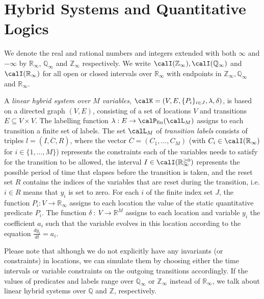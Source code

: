 \documentclass[fleqn,envcountsame]{LMCS}
\newcommand{\ie}{i.e.\xspace}
\newcommand{\Rinf}{\ensuremath{\mathbb{R}_{\infty}}}
\newcommand{\Qinf}{\ensuremath{\mathbb{Q}_{\infty}}}
\newcommand{\Zinf}{\ensuremath{\mathbb{Z}_{\infty}}}
\newcommand{\setR}{\ensuremath{\mathbb{R}}}
\newcommand{\setQ}{\ensuremath{\mathbb{Q}}}
\newcommand{\setZ}{\ensuremath{\mathbb{Z}}}
\newcommand{\Pot}{\ensuremath{\calP}}
\newcommand{\ol}[1]{\ensuremath{\overline{#1}}}
\newcommand{\intervals}{\ensuremath{\calI(\Rinf)}}
\newcommand{\intervalsplus}{\ensuremath{\calI(\Rinf^{\geq 0})}}
\newcommand{\coeff}{\ensuremath{\delta}} \newcommand{\indexi}{\ensuremath{\iota}}
\begin{document}
\section{Hybrid Systems and Quantitative Logics} \label{sec_hybrid}
We denote the real and rational numbers and integers extended with both
$\infty$ and $-\infty$ by $\Rinf$, $\Qinf$ and $\Zinf$ respectively.
We write $\calI(\Zinf), \calI(\Qinf)$ and $\intervals$ for all open or closed
intervals over $\Rinf$ with endpoints in $\Zinf, \Qinf$ and $\Rinf$.

\begin{defi}
A \emph{linear hybrid system over $M$ variables},
$\calK = (V, E, \{P_i\}_{i \in J}, \lambda, \coeff)$,
is based on a directed graph $(V,E)$, consisting of a set of locations $V$
and transitions $E \subseteq V \times V$. The labelling function
$\lambda : E \to \Pot_{\mathrm{fin}}(\calL_M)$ assigns to each transition
a finite set of labels. The set $\calL_M$ of \emph{transition labels}
consists of triples $l = (I, \ol{C}, R)$, where the vector
$\ol{C} = (C_1, \ldots, C_M)$ (with $C_i \in \intervals$ for
$i \in \{1, \ldots, M\}$) represents the constraints each of the variables
needs to satisfy for the transition to be allowed, the interval
$I \in \intervalsplus$ represents the possible period of time
that elapses before the transition is taken,
and the reset set $R$ contains the indices of the
variables that are reset during the transition, 
\ie $i \in R$ means that $y_i$ is set to zero.
For each $i$ of the finite index set $J$,
the function $P_i: V \to \Rinf$ assigns to each location
the value of the static quantitative predicate $P_i$.
The function $\coeff\ :\ V \to \setR^{M}$ assigns to each location
and variable $y_i$ the coefficient $a_i$ such that the variable evolves
in this location according to the equation $\frac {dy_i}{dt} = a_i$.
\end{defi}

Please note that although we do not explicitly have any invariants
(or constraints) in locations, we can simulate them by choosing either
the time intervals or variable constraints on the outgoing transitions
accordingly. If the values of predicates and labels range over $\Qinf$
or $\Zinf$ instead of $\Rinf$, we talk about linear hybrid systems
over $\setQ$ and $\setZ$, respectively. 
\end{document}
